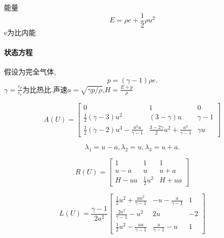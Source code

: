 \documentclass[UTF8]{ctexart}
\begin{document}
能量$$ E=\rho e +\frac{1}{2}\rho u^2$$
e为比内能

\paragraph{状态方程}
假设为完全气体,$$p=(\gamma-1)\rho e.$$
  $\gamma=\frac{c_p}{c_v}$为比热比.声速$a=\sqrt{\gamma p/\rho}$,$H=\frac{E+p}{\rho}$

  \begin{equation*}
       A(U)=  \left[ \begin{matrix}
                        0 & 1 & 0 \\
                        \frac{1}{2}(\gamma-3)u^2 & (3-\gamma)u & \gamma-1 \\
                    \frac{1}{2}(\gamma-2)u^3-\frac{a^2u}{\gamma-1} & \frac{3-2\gamma}{2}u^2+\frac{a^2}{\gamma-1} & \gamma u
                      \end{matrix} \right]
  \end{equation*}

$$
\lambda_1=u-a,\lambda_2=u,\lambda_3=u+a.
$$

  \begin{equation*}
       R(U)=  \left[ \begin{matrix}
                        1 & 1 & 1 \\
                        u-a & u & u+a \\
                    H-ua & \frac{1}{2}u^2 & H+ua
                      \end{matrix} \right]
  \end{equation*}

  \begin{equation*}
       L(U)=  \frac{\gamma-1}{2a^2}\left[ \begin{matrix}
                        \frac{1}{2}u^2+\frac{ua^2}{\gamma-1} & -u-\frac{a}{\gamma-1} & 1 \\
                        \frac{2a^2}{\gamma-1}-u^2 & 2u & -2 \\
                    \frac{1}{2}u^2-\frac{ua}{\gamma-1} & \frac{a}{\gamma-1}-u & 1
                      \end{matrix} \right]
  \end{equation*}
\end{document}
